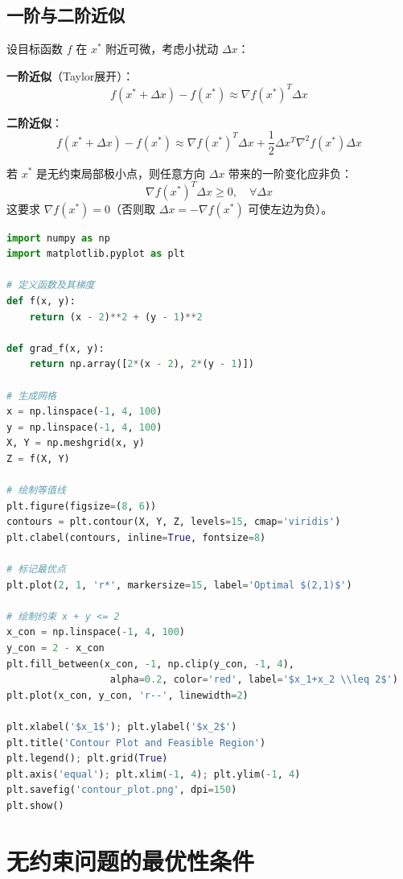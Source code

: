 \subsection{一阶与二阶近似}

设目标函数 $f$ 在 $x^*$ 附近可微，考虑小扰动 $\Delta x$：

\textbf{一阶近似}（Taylor展开）：
\[
f(x^* + \Delta x) - f(x^*) \approx \nabla f(x^*)^T \Delta x
\]

\textbf{二阶近似}：
\[
f(x^* + \Delta x) - f(x^*) \approx \nabla f(x^*)^T \Delta x + \frac{1}{2} \Delta x^T \nabla^2 f(x^*) \Delta x
\]

\begin{conceptbox}[关键观察]
若 $x^*$ 是无约束局部极小点，则任意方向 $\Delta x$ 带来的一阶变化应非负：
\[
\nabla f(x^*)^T \Delta x \geq 0,\quad \forall \Delta x
\]
这要求 $\nabla f(x^*) = 0$（否则取 $\Delta x = -\nabla f(x^*)$ 可使左边为负）。
\end{conceptbox}

\begin{lstlisting}[language=Python, caption=等值线可视化]
import numpy as np
import matplotlib.pyplot as plt

# 定义函数及其梯度
def f(x, y):
    return (x - 2)**2 + (y - 1)**2

def grad_f(x, y):
    return np.array([2*(x - 2), 2*(y - 1)])

# 生成网格
x = np.linspace(-1, 4, 100)
y = np.linspace(-1, 4, 100)
X, Y = np.meshgrid(x, y)
Z = f(X, Y)

# 绘制等值线
plt.figure(figsize=(8, 6))
contours = plt.contour(X, Y, Z, levels=15, cmap='viridis')
plt.clabel(contours, inline=True, fontsize=8)

# 标记最优点
plt.plot(2, 1, 'r*', markersize=15, label='Optimal $(2,1)$')

# 绘制约束 x + y <= 2
x_con = np.linspace(-1, 4, 100)
y_con = 2 - x_con
plt.fill_between(x_con, -1, np.clip(y_con, -1, 4), 
                  alpha=0.2, color='red', label='$x_1+x_2 \\leq 2$')
plt.plot(x_con, y_con, 'r--', linewidth=2)

plt.xlabel('$x_1$'); plt.ylabel('$x_2$')
plt.title('Contour Plot and Feasible Region')
plt.legend(); plt.grid(True)
plt.axis('equal'); plt.xlim(-1, 4); plt.ylim(-1, 4)
plt.savefig('contour_plot.png', dpi=150)
plt.show()
\end{lstlisting}

\section{无约束问题的最优性条件}\label{sec:optimality-unconstrained}

